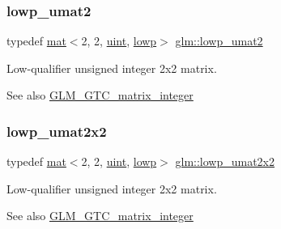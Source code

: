 \subsubsection{\texorpdfstring{lowp\+\_\+umat2}{lowp\_umat2}}
{\footnotesize\ttfamily typedef \hyperlink{structglm_1_1mat}{mat}$<$2, 2, \hyperlink{group__core__precision_ga4fd29415871152bfb5abd588334147c8}{uint}, \hyperlink{namespaceglm_a36ed105b07c7746804d7fdc7cc90ff25ae161af3fc695e696ce3bf69f7332bc2d}{lowp}$>$ \hyperlink{group__gtc__matrix__integer_ga51cca2e9b98db6345e8c60b7d00c79cf}{glm\+::lowp\+\_\+umat2}}

Low-\/qualifier unsigned integer 2x2 matrix. \begin{DoxySeeAlso}{See also}
\hyperlink{group__gtc__matrix__integer}{G\+L\+M\+\_\+\+G\+T\+C\+\_\+matrix\+\_\+integer} 
\end{DoxySeeAlso}
\mbox{\label{group__gtc__matrix__integer_gafbc94510f73d2a99348be30bda37a502}} 
\subsubsection{\texorpdfstring{lowp\+\_\+umat2x2}{lowp\_umat2x2}}
{\footnotesize\ttfamily typedef \hyperlink{structglm_1_1mat}{mat}$<$2, 2, \hyperlink{group__core__precision_ga4fd29415871152bfb5abd588334147c8}{uint}, \hyperlink{namespaceglm_a36ed105b07c7746804d7fdc7cc90ff25ae161af3fc695e696ce3bf69f7332bc2d}{lowp}$>$ \hyperlink{group__gtc__matrix__integer_gafbc94510f73d2a99348be30bda37a502}{glm\+::lowp\+\_\+umat2x2}}

Low-\/qualifier unsigned integer 2x2 matrix. \begin{DoxySeeAlso}{See also}
\hyperlink{group__gtc__matrix__integer}{G\+L\+M\+\_\+\+G\+T\+C\+\_\+matrix\+\_\+integer} 
\end{DoxySeeAlso}
\mbox{\label{group__gtc__matrix__integer_gafd5d32892f45c112f974b8d91fc4e25a}} 
